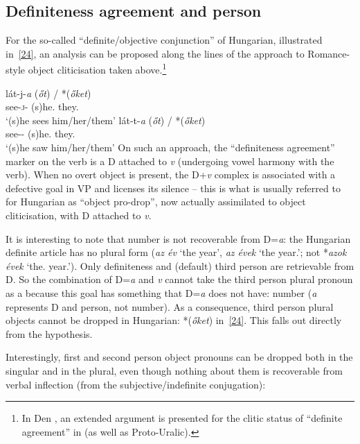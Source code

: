\documentclass[output=paper]{langsci/langscibook}
\begin{document}
\begin{refcontext}
\section{Definiteness agreement and person}
\label{sec:16.5}

For the so-called \enquote{definite/objective conjunction} of Hungarian, illustrated
in~\eqref{24}, an analysis can be proposed along the lines of the approach to
Romance-style object cliticisation taken above.\footnote{In Den
    \cite{dikkenkeneseifs}, an extended argument is presented for the clitic
    status of \enquote{definite agreement} in  (as well as Proto-Uralic).}

\ea \label{24}
    \ea \gll l\'at-j-\emph{a} (\emph{\H{o}t}) / *(\emph{\H{o}ket})\\
    see-\textsc{j}-\Def{} (s)he.\Acc{} {} \phantom{*(}they.\Acc{}\\
    \glt \enquote*{(s)he sees him/her/them}
     \ex \gll   l\'at-t-\emph{a} (\emph{\H{o}t}) / *(\emph{\H{o}ket})\\
    see-\Pst-\Def{} (s)he.\Acc{} {} \phantom{*(}they.\Acc{}\\
    \glt \enquote*{(s)he saw him/her/them}
    \z
\z
On such an approach, the \enquote{definiteness agreement} marker on the verb is a D
attached to \emph{v} (undergoing vowel harmony with the verb). When no overt
object is present, the D+\emph{v} complex is associated with a defective goal
in VP and licenses its silence -- this is what is usually referred to for
Hungarian as \enquote{object pro-drop}, now actually assimilated to object
cliticisation, with D attached to \emph{v}.

It is interesting to note that number is not recoverable from D=\emph{a}: the
Hungarian definite article has no plural form (\emph{az \'ev} \enquote*{the year},
\emph{az \'evek} \enquote*{the year.\Pl{}}; not *\emph{azok \'evek}
\enquote*{the.\Pl{} year.\Pl{}}).  Only definiteness and (default) third
person are retrievable from D. So the combination of D=\emph{a} and \emph{v}
cannot take the third person plural pronoun as a  because this
goal has something that D=\emph{a} does not have: number (\emph{a} represents D
and person, not number). As a consequence, third person plural objects cannot
be dropped in Hungarian: *(\emph{\H{o}ket}) in~\eqref{24}. This falls out
directly from the  hypothesis.

Interestingly, first and second person object pronouns can be dropped both in
the singular and in the plural, even though nothing about them is recoverable
from verbal inflection (from the subjective/indefinite conjugation):


\end{refcontext}
\end{document}
